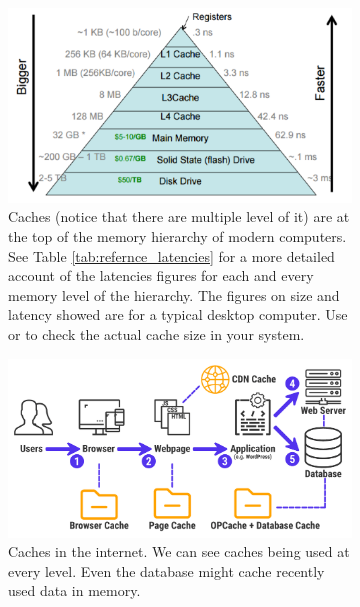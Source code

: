 \begin{figure}
	\centering
	\begin{subfigure}[t]{0.49\textwidth}
		\includegraphics[width=1\linewidth]{sources/LRU_cache/images/cpu_caches}
		\caption{Caches (notice that there are multiple level of it) are at the top of the memory hierarchy of modern computers. See Table \ref{tab:refernce_latencies} for a more detailed account of the latencies figures for each and every memory level of the hierarchy. The figures on size and latency showed are for a typical desktop computer. Use  or  to check the actual cache size in your system.}
		\label{fig:LRU_cache:cpu_cache}
	 \end{subfigure}
	\hfill
	\begin{subfigure}[t]{0.49\textwidth}
		\includegraphics[width=1\linewidth]{sources/LRU_cache/images/web_caches}
		\caption{Caches in the internet. We can see caches being used at every level. Even the database might cache recently used data in memory.}
		\label{fig:LRU_cache:web_cache}
	 \end{subfigure}
	 \caption[]{}
	  \label{fig:LRU_cache:caches_example}
\end{figure}



